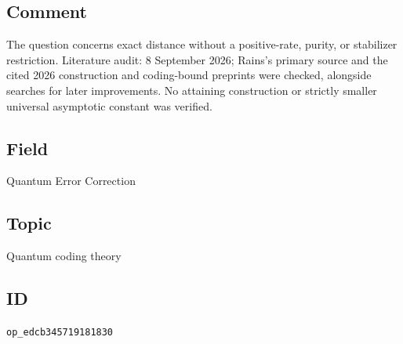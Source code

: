 \subsection*{Comment}

The question concerns exact distance without a positive-rate, purity, or stabilizer restriction. Literature audit: 8 September 2026; Rains's primary source and the cited 2026 construction and coding-bound preprints were checked, alongside searches for later improvements. No attaining construction or strictly smaller universal asymptotic constant was verified.

\subsection*{Field}

Quantum Error Correction

\subsection*{Topic}

Quantum coding theory

\subsection*{ID}

\texttt{op\_edcb345719181830}
